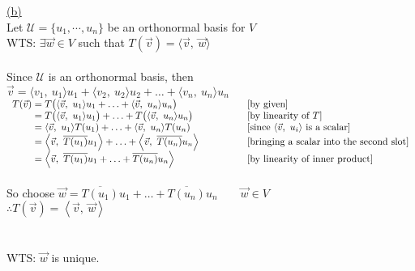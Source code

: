 \documentclass[12pt]{article}
\begin{document}
\hyperlink{toc}{\hypertarget{4.2}{(b)}}\\
Let $\mathcal{U} = \{u_1, \cdots, u_n\}$ be an orthonormal basis for $V$\\
WTS: $\exists \vec{w} \in V$ such that $T(\vec{v}) =\langle \vec{v}, \ \vec{w} \rangle$
\\\\
Since $\mathcal{U}$ is an orthonormal basis, then $\vec{v} = \langle v_1, \ u_1 \rangle u_1 + \langle v_2, \ u_2 \rangle u_2 +\ldots +\langle v_n, \ u_n \rangle u_n$\\
{$\begin{array}{r@{}>{\displaystyle}ll}
		T(\vec{v}) & {}= T\big(\langle \vec{v}, \ u_1 \rangle u_1 + \ldots +\langle \vec{v}, \ u_n \rangle u_n\big)                                                       & [\text{by given}]                                                 \\
		           & {}=  T\big(\langle \vec{v}, \ u_1 \rangle u_1 \big) + \ldots +T\big(\langle \vec{v}, \ u_n \rangle u_n\big)                                          & [\text{by linearity of }T]                                        \\
		           & {}= \langle \vec{v}, \ u_1 \rangle T(u_1 ) + \ldots +\langle \vec{v}, \ u_n \rangle T(u_n)                                                           & [\text{since }\langle \vec{v}, \ u_i \rangle \text{ is a scalar}] \\
		           & {}= \left\langle \vec{v}, \ \overline{T(u_1 )}u_1 \right\rangle  + \ldots +\left\langle \vec{v}, \ \overline{T(u_n )}u_n \right\rangle \qquad \qquad & [\text{bringing a scalar into the second slot}]                   \\
		           & {}= \left\langle \vec{v}, \ \overline{T(u_1)}u_1 + \ldots + \overline{T(u_n)}u_n \right\rangle                                                       & [\text{by linearity of inner product}]                            \\
	\end{array}$}
\\\\
So choose $\displaystyle \vec{w} = \overline{T(u_1)}u_1 + \ldots + \overline{T(u_n)}u_n \qquad \vec{w} \in V$\\
$\therefore T(\vec{v}) = \left\langle \vec{v}, \ \vec{w} \right\rangle$
\\\\\\
WTS: $\vec{w}$ is unique.
\\\\
\end{document}

